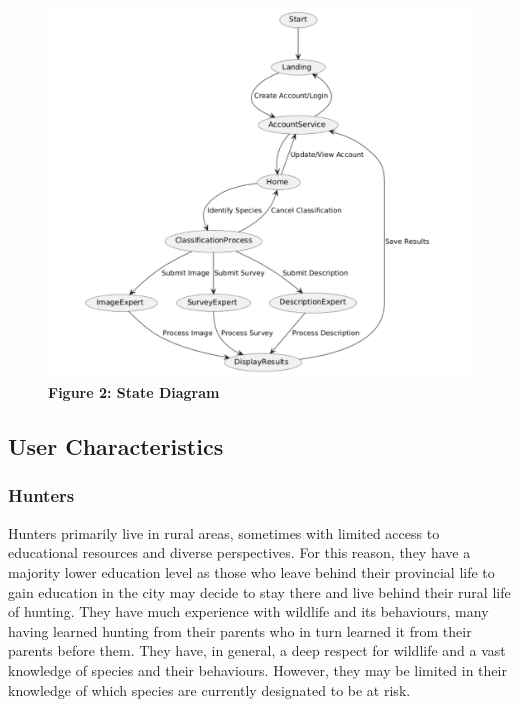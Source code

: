 \documentclass[]{article}
\begin{document}
\begin{figure}[h]
    \centering
    \includegraphics[scale=0.50]{2.2StateDiagram.png}
    \caption*{\textbf{Figure 2: State Diagram}} %
\end{figure}

\subsection{User Characteristics}
\label{sub:user_characteristics}
\subsubsection{Hunters}
Hunters primarily live in rural areas, sometimes with limited access to educational resources and diverse perspectives. For this reason, they have a majority lower education level 
as those who leave behind their provincial life to gain education in the city may decide to stay there and live behind their rural life of hunting. They have much experience with
 wildlife and its behaviours, many having learned hunting from their parents who in turn learned it from their parents before them. They have, in general,
 a deep respect for wildlife and a vast knowledge of species and their behaviours. However, they may be limited in their knowledge of which species are 
 currently designated to be at risk.
\end{document}
